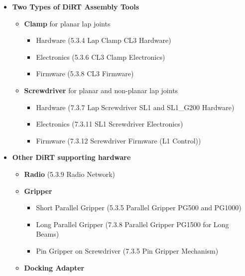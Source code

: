 \begin{itemize}
\begin{itemize}
\end{itemize}
	\item \textbf{Two Types of DiRT Assembly Tools}

\begin{itemize}

	\item \textbf{Clamp }for planar lap joints

    \begin{itemize}
    	\item Hardware (5.3.4 Lap Clamp CL3 Hardware)
    	\item Electronics (5.3.6 CL3 Clamp Electronics)
    	\item Firmware (5.3.8 CL3 Firmware)
    \end{itemize}
    \item \textbf{Screwdriver }for planar and non-planar lap joints 

\begin{itemize}
	\item Hardware (7.3.7 Lap Screwdriver SL1 and SL1\_G200 Hardware)

	\item Electronics (7.3.11 SL1 Screwdriver Electronics)

	\item Firmware (7.3.12 Screwdriver Firmware (L1 Control))

\end{itemize}
\end{itemize}
	\item \textbf{Other DiRT supporting hardware}

\begin{itemize}
	\item \textbf{Radio }(5.3.9 Radio Network)

	\item \textbf{Gripper }

\begin{itemize}
	\item Short Parallel Gripper (5.3.5 Parallel Gripper PG500 and PG1000)

	\item Long Parallel Gripper (7.3.8 Parallel Gripper PG1500 for Long Beams)

	\item Pin Gripper on Screwdriver (7.3.5 Pin Gripper Mechanism)

\end{itemize}
	\item \textbf{Docking Adapter}


\end{itemize}
\end{itemize}

